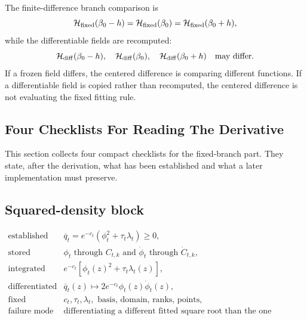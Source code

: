 \documentclass[11pt]{article}
\numberwithin{equation}{section}
\begin{document}
The finite-difference branch comparison is
\begin{equation}
    \mathcal H_{\rm fixed}(\beta_0-h)
    =
    \mathcal H_{\rm fixed}(\beta_0)
    =
    \mathcal H_{\rm fixed}(\beta_0+h),
    \label{eq:p24-p23-man6}
\end{equation}
while the differentiable fields are recomputed:
\begin{equation}
    \mathcal H_{\rm diff}(\beta_0-h),
    \quad
    \mathcal H_{\rm diff}(\beta_0),
    \quad
    \mathcal H_{\rm diff}(\beta_0+h)
    \quad
    \text{may differ.}
    \label{eq:p24-p23-man7}
\end{equation}
If a frozen field differs, the centered difference is comparing different
functions.  If a differentiable field is copied rather than recomputed, the
centered difference is not evaluating the fixed fitting rule.

\subsection{Four Checklists For Reading The Derivative}

This section collects four compact checklists for the fixed-branch part.  They
state, after the derivation, what has been established and what a later
implementation must preserve.

\subsection*{Squared-density block}

\begin{equation}
\begin{array}{ll}
\text{established} &
    \overline q_t=e^{-c_t}(\phi_t^2+\tau_t\lambda_t)\ge0,\\[1mm]
\text{stored} &
    \phi_t \text{ through } C_{t,k}
    \text{ and } \dot\phi_t \text{ through } \dot C_{t,k},\\[1mm]
\text{integrated} &
    e^{-c_t}\left[\phi_t(z)^2+\tau_t\lambda_t(z)\right],\\[1mm]
\text{differentiated} &
    \overline q_t(z)
    \mapsto 2e^{-c_t}\phi_t(z)\dot\phi_t(z),\\[1mm]
\text{fixed} &
    c_t,\tau_t,\lambda_t,\text{ basis, domain, ranks, points},\\[1mm]
\text{failure mode} &
    \text{differentiating a different fitted square root than the one squared.}
\end{array}
\label{eq:p24-p22-r1}
\end{equation}
\end{document}
